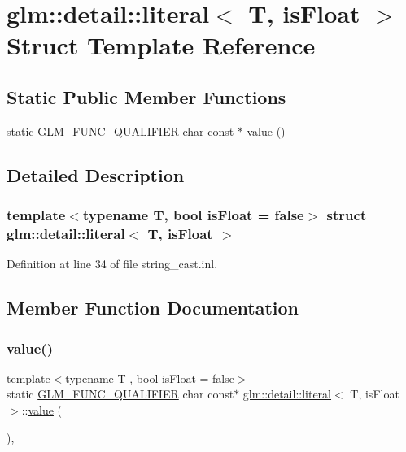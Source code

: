 \hypertarget{structglm_1_1detail_1_1literal}{}\section{glm\+::detail\+::literal$<$ T, is\+Float $>$ Struct Template Reference}
\label{structglm_1_1detail_1_1literal}
\subsection*{Static Public Member Functions}
\begin{DoxyCompactItemize}
\item 
static \mbox{\hyperlink{setup_8hpp_a33fdea6f91c5f834105f7415e2a64407}{G\+L\+M\+\_\+\+F\+U\+N\+C\+\_\+\+Q\+U\+A\+L\+I\+F\+I\+ER}} char const  $\ast$ \mbox{\hyperlink{structglm_1_1detail_1_1literal_a14fd9d6fec8d35f7a2fd3b0095d17b6a}{value}} ()
\end{DoxyCompactItemize}


\subsection{Detailed Description}
\subsubsection*{template$<$typename T, bool is\+Float = false$>$\newline
struct glm\+::detail\+::literal$<$ T, is\+Float $>$}



Definition at line 34 of file string\+\_\+cast.\+inl.



\subsection{Member Function Documentation}
\mbox{\label{structglm_1_1detail_1_1literal_a14fd9d6fec8d35f7a2fd3b0095d17b6a}} 
\subsubsection{\texorpdfstring{value()}{value()}}
{\footnotesize\ttfamily template$<$typename T , bool is\+Float = false$>$ \\
static \mbox{\hyperlink{setup_8hpp_a33fdea6f91c5f834105f7415e2a64407}{G\+L\+M\+\_\+\+F\+U\+N\+C\+\_\+\+Q\+U\+A\+L\+I\+F\+I\+ER}} char const$\ast$ \mbox{\hyperlink{structglm_1_1detail_1_1literal}{glm\+::detail\+::literal}}$<$ T, is\+Float $>$\+::\mbox{\hyperlink{glad_8h_a03aff08f73d7fde3d1a08e0abd8e84fa}{value}} (\begin{DoxyParamCaption}{ }\end{DoxyParamCaption})\hspace{0.3cm}{\ttfamily [inline]}, {\ttfamily [static]}}



